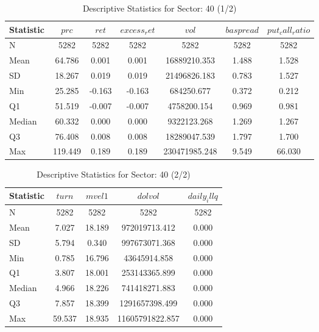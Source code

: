     \begin{table}[ht]
    \centering

    
    \caption{Descriptive Statistics for Sector: 40 (1/2)}
    \label{tab:sec40_a}
    
    \begin{tabular}{lcccccc}
    \toprule
    Statistic & $prc$ & $ret$ & $excess_ret$ & $vol$ & $baspread$ & $put_call_ratio$ \\\midrule
    N & 5282 & 5282 & 5282 & 5282 & 5282 & 5282 \\
    Mean & 64.786 & 0.001 & 0.001 & 16889210.353 & 1.488 & 1.528 \\
    SD & 18.267 & 0.019 & 0.019 & 21496826.183 & 0.783 & 1.527 \\
    Min & 25.285 & -0.163 & -0.163 & 684250.677 & 0.372 & 0.212 \\
    Q1 & 51.519 & -0.007 & -0.007 & 4758200.154 & 0.969 & 0.981 \\
    Median & 60.332 & 0.000 & 0.000 & 9322123.268 & 1.269 & 1.267 \\
    Q3 & 76.408 & 0.008 & 0.008 & 18289047.539 & 1.797 & 1.700 \\
    Max & 119.449 & 0.189 & 0.189 & 230471985.248 & 9.549 & 66.030 \\
    \bottomrule
    \end{tabular}

    \end{table}
    
    \begin{table}[ht]
    \centering

    
    \caption{Descriptive Statistics for Sector: 40 (2/2)}
    \label{tab:sec40_b}
    
    \begin{tabular}{lcccc}
    \toprule
    Statistic & $turn$ & $mvel1$ & $dolvol$ & $daily_illq$ \\\midrule
    N & 5282 & 5282 & 5282 & 5282 \\
    Mean & 7.027 & 18.189 & 972019713.412 & 0.000 \\
    SD & 5.794 & 0.340 & 997673071.368 & 0.000 \\
    Min & 0.785 & 16.796 & 43645914.858 & 0.000 \\
    Q1 & 3.807 & 18.001 & 253143365.899 & 0.000 \\
    Median & 4.966 & 18.226 & 741418271.883 & 0.000 \\
    Q3 & 7.857 & 18.399 & 1291657398.499 & 0.000 \\
    Max & 59.537 & 18.935 & 11605791822.857 & 0.000 \\
    \bottomrule
    \end{tabular}

    \end{table}
    
